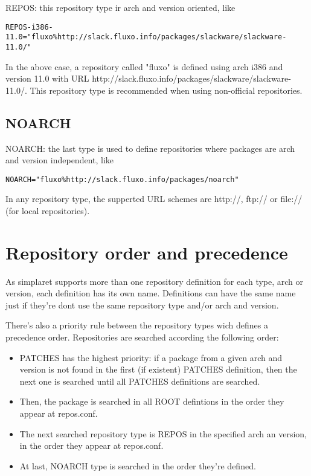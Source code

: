 \documentclass{article}
\begin{document}
REPOS: this repository type ir arch and version oriented, like

\begin{verbatim}
REPOS-i386-11.0="fluxo%http://slack.fluxo.info/packages/slackware/slackware-11.0/"
\end{verbatim}

In the above case, a repository called "fluxo" is defined using arch i386 and version 11.0 with URL http://slack.fluxo.info/packages/slackware/slackware-11.0/. This repository type is recommended when using non-official repositories.

\subsection{NOARCH}

NOARCH: the last type is used to define repositories where packages are arch and version independent, like

\begin{verbatim}
NOARCH="fluxo%http://slack.fluxo.info/packages/noarch"
\end{verbatim}

In any repository type, the supperted URL schemes are http://, ftp:// or file:// (for local repositories).

\section{Repository order and precedence}

As simplaret supports more than one repository definition for each type, arch or version, each definition has its own name. Definitions can have the same name just if they're dont use the same repository type and/or arch and version.

There's also a priority rule between the repository types wich defines a precedence order.  Repositories are searched according the following order:

\begin{itemize}
  \item PATCHES has the highest priority: if a package from a given arch and version is not found in the first (if existent) PATCHES definition, then the next one is searched until all PATCHES definitions are searched.
  \item Then, the package is searched in all ROOT defintions in the order they appear at repos.conf.  
  \item The next searched repository type is REPOS in the specified arch an version, in the order they appear at repos.conf.
  \item At last, NOARCH type is searched in the order they're defined.
\end{itemize}
\end{document}

